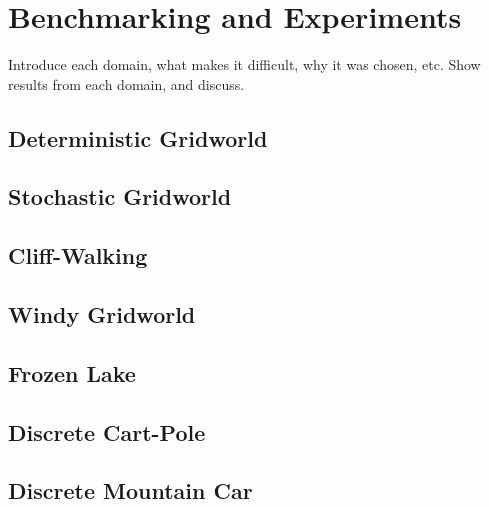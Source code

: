 \chapter{Benchmarking and Experiments}
\label{chapter5}
Introduce each domain, what makes it difficult, why it was chosen, etc. Show results from each domain, and discuss.
\cite{osband2020bsuite, 1606.01540}
\section{Deterministic Gridworld}

\section{Stochastic Gridworld}

\section{Cliff-Walking}

\section{Windy Gridworld}

\section{Frozen Lake}

\section{Discrete Cart-Pole}

\section{Discrete Mountain Car}